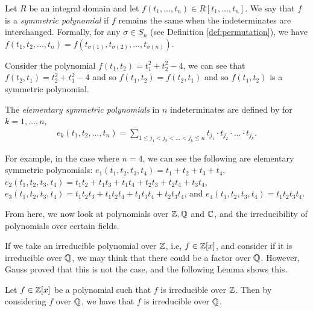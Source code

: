 \begin{definition}
	Let $R$ be an integral domain and let $f(t_1, \dots, t_n) \in R[t_1, \dots, t_n]$. We say that $f$ is
    a \textit{symmetric polynomial} if $f$ remains the same when the indeterminates are interchanged. 
    Formally, for any $\sigma \in S_n$ (see Definition \ref{def:permutation}), we have $f(t_1,t_2,...,t_n) = f(t_{\sigma(1)},t_{\sigma(2)},...,t_{\sigma(n)})$.
\end{definition}

\begin{example}
    Consider the polynomial 
    $f(t_1,t_2)=t_1^2+t_2^2-4$, we can see that $f(t_2,t_1)=t_2^2+t_1^2-4$ and so $f(t_1,t_2)=f(t_2,t_1)$ and so $f(t_1,t_2)$ is a symmetric polynomial.
\end{example}

\begin{definition}
    The \textit{elementary symmetric polynomials} in $n$ indeterminates are defined by for $k = 1, \dots, n$,
    \begin{align*}
    e_k(t_1,t_2,...,t_n) = \sum_{1\leq j_1<j_2<...<j_k\leq n} t_{j_1}\cdot t_{j_2} \cdot ... \cdot t_{j_k}.
    \end{align*}
\end{definition}

\begin{example}
    For example, in the case where $n=4$, we can see the following are elementary symmetric polynomials: $e_1(t_1,t_2,t_3,t_4) = t_1 + t_2 + t_3 + t_4$, $e_2(t_1, t_2, t_3, t_4) = t_1t_2 + t_1t_3 + t_1t_4 + t_2t_3 + t_2t_4 + t_3t_4$,  $e_3(t_1,t_2,t_3,t_4) = t_1t_2t_3+t_1t_2t_4+t_1t_3t_4+t_2t_3t_4$, and $e_4(t_1, t_2, t_3, t_4) = t_1 t_2 t_3 t_4$. 
\end{example}

From here, we now look at polynomials over $\mathbb Z, \mathbb Q$ and $\mathbb C$, and the irreducibility of polynomials over certain fields.

If we take an irreducible polynomial over $\mathbb Z$, i.e, $f \in \mathbb Z[x]$, and consider if it is irreducible over $\mathbb Q$, we may think that there could be a factor over $\mathbb Q$. However, Gauss proved that this is not the case, and the following Lemma shows this.

\begin{lemma}
     Let $f \in \mathbb Z[x]$ be a polynomial such that $f$ is irreducible over $\mathbb Z$. Then by considering $f$ over $\mathbb Q$, we have that $f$ is irreducible over $\mathbb Q$.
    
\end{lemma}

